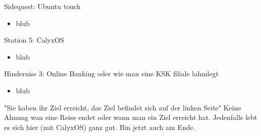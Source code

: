 \documentclass[14pt,compress,usenames,dvipsnames,aspectratio=169]{beamer}
\begin{document}
\begin{frame}{Sidequest: Ubuntu touch}
    \begin{itemize}
        \item blub
    \end{itemize}
\end{frame}

\begin{frame}{Station 5: CalyxOS}
    \begin{itemize}
        \item blub
    \end{itemize}
\end{frame}

\begin{frame}{Hinderniss 3: Online Banking}
    oder wie man eine KSK filiale lahmlegt
    \begin{itemize}
        \item blub
    \end{itemize}
\end{frame}

\begin{frame}{"Sie haben ihr Ziel erreicht, das Ziel befindet sich auf der linken Seite"}
    Keine Ahnung wan eine Reise endet oder wann man ein Ziel erreicht hat. 
    Jedenfalls lebt es sich hier (mit CalyxOS) ganz gut.
    Bin jetzt auch am Ende.
\end{frame}
\end{document}

